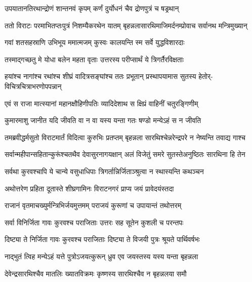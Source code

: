 \twolineshloka
{उपयातानतिरथान्द्रोणं शान्तनवं कृपम्}
{कर्णं दुर्योधनं चैव द्रोणपुत्रं च षड्रथान्}


\twolineshloka
{ततो विराटः परमाभितप्तःपुत्रं निशम्यैकरथेन यातम्}
{बृहन्नलासारथिमाजिमर्दनम्प्रोवाच सर्वानथ मन्त्रिमुख्यान्}


\twolineshloka
{गवां शतसहस्राणि उभिभूय ममात्मजम्}
{कुस्वः कालयन्ति स्म सर्वे युद्धविशारदाः}


\twolineshloka
{तस्माद्गच्छतु मे योधा बलेन महता वृताः}
{उत्तरस्य परीप्सार्थं ये त्रिगर्तैरविक्षताः}



\fourlineindentedshloka
{हयांश्च नागांश्च रथांश्च शीघ्रं}
{वादित्रसङ्घांश्च ततः प्रभूतान्}
{प्रस्थापयामास सुतस्य हेतोर्-}
{विचित्रचित्राभरणोपपन्नान्}


\twolineshloka
{एवं स राजा मात्स्यानां महानक्षौहिणीपतिः}
{व्यादिदेशाथ स क्षिप्रं वाहिनीं चतुरङ्गिणीम्}


\twolineshloka
{कुमारमाशु जानीत यदि जीवति वा न वा}
{यस्य यन्ता गतः षण्डो मन्येऽहं स न जीवति}


\twolineshloka
{तमब्रवीद्धर्मसुतो विराटमार्तं विदित्वा कुरुभिः प्रतप्तम्}
{बृहन्नला सारथिश्चेन्नरेन्द्रपरे न नेष्यन्ति तवाद्य गाश्च}


\twolineshloka
{सर्वान्महीपान्सहितान्कुरूंश्चतथैव देवासुरनागयक्षान्}
{अलं विजेतुं समरे सुतस्तेअनुष्ठितः सारथिना हि तेन}


\twolineshloka
{सर्वथा कुरवश्चापि ये चान्ये वसुधाधिपाः}
{त्रिगर्तान्निर्जिताञ्श्रुत्वा न स्थास्यन्ति कथञ्चन}



\twolineshloka
{अथोत्तरेण प्रहिता दूतास्ते शीघ्रगामिनः}
{विराटनगरं प्राप्य जयं प्रावेदयंस्तदा}


\twolineshloka
{राजानं वृतमाचख्युर्मन्त्रिभिर्जयमुत्तमम्}
{पराजयं कुरूणां च उपायान्तं तथोत्तरम्}


\twolineshloka
{सर्वा विनिर्जिता गावः कुरवश्च पराजिताः}
{उत्तरः सह सूतेन कुशली च परन्तपः}




\twolineshloka
{दिष्ट्या ते निर्जिता गावः कुरवश्च पराजिताः}
{दिष्ट्या ते विजयी पुत्रः श्रूयते पार्थिवर्षभः}


\twolineshloka
{नाद्भुतं त्विह मन्येऽहं यत्ते पुत्रोऽजयत्कुरून्}
{ध्रुव एव जयस्तस्य यस्य यन्ता बृहन्नला}


\twolineshloka
{देवेन्द्रसारथिश्चैव मातलिः ख्यातविक्रमः}
{कृष्णस्य सारथिश्चैव न बृहन्नलया समौ}


